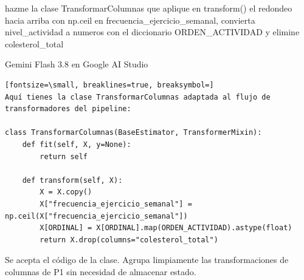 \documentclass[12pt,a4paper,oneside]{book}
\begin{document}
\begin{iaprompt}
hazme la clase TransformarColumnas que aplique en transform() el redondeo hacia arriba con np.ceil en frecuencia_ejercicio_semanal, convierta nivel_actividad a numeros con el diccionario ORDEN_ACTIVIDAD y elimine colesterol_total
\end{iaprompt}
\begin{iaresp}{Gemini Flash 3.8 en Google AI Studio}
\begin{Verbatim}[fontsize=\small, breaklines=true, breaksymbol=]
Aquí tienes la clase TransformarColumnas adaptada al flujo de transformadores del pipeline:

class TransformarColumnas(BaseEstimator, TransformerMixin):
    def fit(self, X, y=None):
        return self

    def transform(self, X):
        X = X.copy()
        X["frecuencia_ejercicio_semanal"] = np.ceil(X["frecuencia_ejercicio_semanal"])
        X[ORDINAL] = X[ORDINAL].map(ORDEN_ACTIVIDAD).astype(float)
        return X.drop(columns="colesterol_total")
\end{Verbatim}
\end{iaresp}
\begin{iaanalisis}
Se acepta el código de la clase. Agrupa limpiamente las transformaciones de columnas de P1 sin necesidad de almacenar estado.
\end{iaanalisis}
\end{document}
